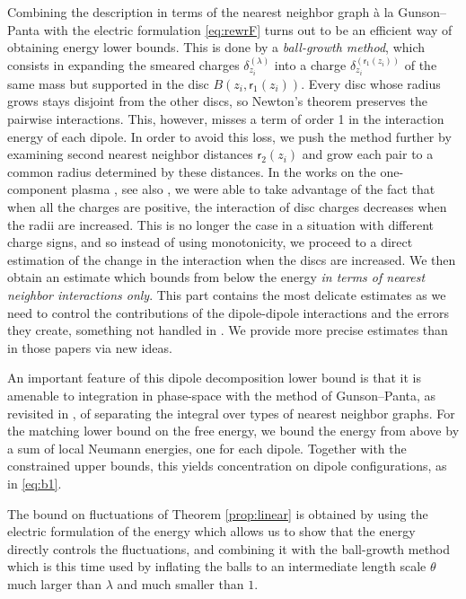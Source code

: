 \documentclass[a4paper,10pt,leqno]{amsart}
\numberwithin{equation}{section}
\def\rr{\mathsf{r}}
\begin{document}
Combining the description in terms of the nearest neighbor graph \`a la Gunson--Panta with the electric formulation \eqref{eq:rewrF} turns out to be an efficient way of obtaining energy lower bounds. This is done by a \emph{ball-growth method}, which consists in expanding the smeared charges $\delta_{z_i}^{(\lambda)} $ into a charge $\delta_{z_i}^{(\rr_1(z_i))}$ of the same mass but supported in the disc $ B(z_i, \rr_1(z_i))$. Every disc whose radius grows stays disjoint from the other discs, so Newton's theorem preserves the pairwise interactions. This, however, misses a term of order 1 in the interaction energy of each dipole.
In order to avoid this loss, we push the method further by examining second nearest neighbor distances $\rr_2(z_i)$ and grow each pair to a common radius determined by these distances.
In the works on the one-component plasma \cite{LS2,Armstrong2019LocalLA,serfaty2020gaussian}, see also \cite[Chap. 4]{serfaty2024lectures}, we were able to take advantage of the fact that when all the charges are positive, the interaction of disc charges decreases when the radii are increased. This is no longer the case in a situation with different charge signs, and so instead of using monotonicity, we proceed to a direct estimation of the change in the interaction when the discs are increased. We then obtain an estimate which bounds from below the energy \emph{in terms of nearest neighbor interactions only}.
This part contains the most delicate estimates as we need to control the contributions of the dipole-dipole interactions and the errors they create, something not handled in \cite{GunPan,LSZ}. We provide more precise estimates than in those papers via new ideas.

An important feature of this dipole decomposition lower bound is that it is amenable to integration in phase-space with the method of Gunson--Panta, as revisited in \cite{LSZ}, of separating the integral over types of nearest neighbor graphs.
For the matching lower bound on the free energy, we bound the energy from above by a sum of local Neumann energies, one for each dipole.
Together with the constrained upper bounds, this yields concentration on dipole configurations, as in \eqref{eq:b1}.

The bound on fluctuations of Theorem \ref{prop:linear} is obtained by using the electric formulation of the energy which allows us to show that the energy directly controls the fluctuations, and combining it with the ball-growth method which is this time used by inflating the balls to an intermediate length scale $\theta$ much larger than $\lambda$ and much smaller than $1$.
\end{document}
